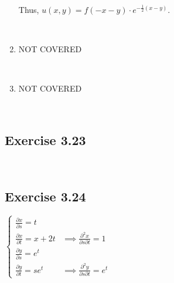 \documentclass[11pt,fleqn]{book} %
\begin{document}
\begin{enumerate}
    Thus, $u(x, y) = f(-x - y) \cdot e^{-\frac{1}{2}(x - y)}$. 

    {~~~}

    \item NOT COVERED
    
    {~~~}

    \item NOT COVERED
\end{enumerate}

{~~~}

\subsection*{Exercise 3.23}

{~~~}

\subsection*{Exercise 3.24}

$\begin{cases}
    \frac{\partial x}{\partial s} = t \\
    \frac{\partial x}{\partial t} = x + 2t & \implies \frac{\partial^2 x}{\partial s \partial t} = 1 \\
    \frac{\partial y}{\partial s} = e^t \\
    \frac{\partial y}{\partial t} = se^t & \implies \frac{\partial ^2y}{\partial s \partial t} = e^t
\end{cases}$
\end{document}
